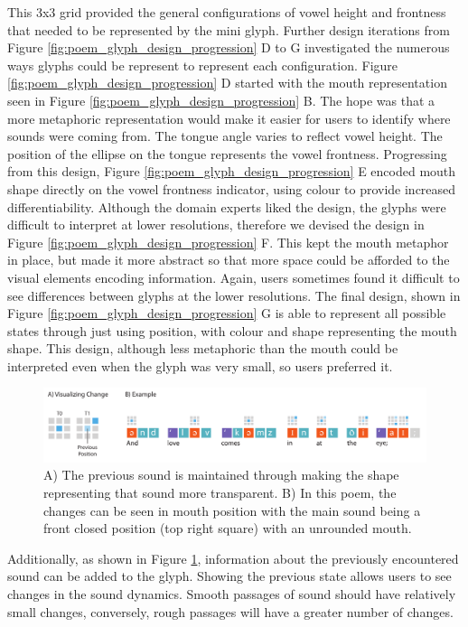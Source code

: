 This 3x3 grid provided the general configurations of vowel height and frontness that needed to be represented by the mini glyph.
Further design iterations from Figure \ref{fig:poem_glyph_design_progression} D to G investigated the numerous ways glyphs could be represent to represent each configuration. 
Figure \ref{fig:poem_glyph_design_progression} D started with the mouth representation seen in Figure \ref{fig:poem_glyph_design_progression} B.
The hope was that a more metaphoric representation would make it easier for users to identify where sounds were coming from.
The tongue angle varies to reflect vowel height.
The position of the ellipse on the tongue represents the vowel frontness.
Progressing from this design, Figure \ref{fig:poem_glyph_design_progression} E encoded mouth shape directly on the vowel frontness indicator, using colour to provide increased differentiability.
Although the domain experts liked the design, the glyphs were difficult to interpret at lower resolutions, therefore we devised the design in Figure \ref{fig:poem_glyph_design_progression} F.
This kept the mouth metaphor in place, but made it more abstract so that more space could be afforded to the visual elements encoding information.
Again, users sometimes found it difficult to see differences between glyphs at the lower resolutions.
The final design, shown in Figure \ref{fig:poem_glyph_design_progression} G is able to represent all possible states through just using position, with colour and shape representing the mouth shape.
This design, although less metaphoric than the mouth could be interpreted even when the glyph was very small, so users preferred it.

\begin{figure}[t!]
\centering
\includegraphics[width=\textwidth]{images/other_glyphs/poem_glyph_change}
\caption{A) The previous sound is maintained through making the shape representing that sound more transparent. B) In this poem, the changes can be seen in mouth position with the main sound being a front closed position (top right square) with an unrounded mouth.}
\label{fig:poem_glyph_change}
\end{figure}

Additionally, as shown in Figure \ref{fig:poem_glyph_change}, information about the previously encountered sound can be added to the glyph.
Showing the previous state allows users to see changes in the sound dynamics.
Smooth passages of sound should have relatively small changes, conversely, rough passages will have a greater number of changes.

